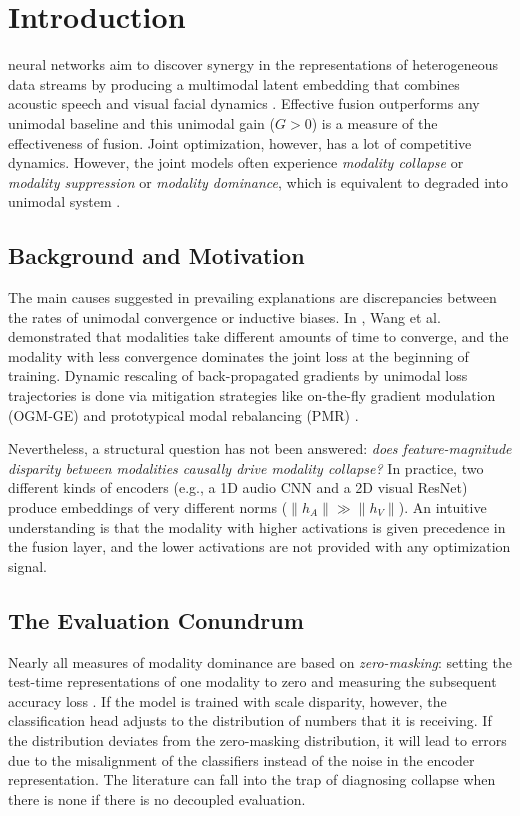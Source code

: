 \documentclass[conference]{IEEEtran}
\begin{document}
\section{Introduction}
  neural networks aim to discover synergy in the representations of heterogeneous data streams by producing a multimodal latent embedding that combines acoustic speech and visual facial dynamics \cite{baltrusaitis2019multimodal}.%
 Effective fusion outperforms any unimodal baseline and this unimodal gain ($G > 0$) is a measure of the effectiveness of fusion. Joint optimization, however, has a lot of competitive dynamics. However, the joint models often experience \textit{modality collapse} or \textit{modality suppression} or \textit{modality dominance}, which is equivalent to degraded into unimodal system \cite{wang2020makes, peng2022balanced, wu2022characterizing}.

\subsection{Background and Motivation}
The main causes suggested in prevailing explanations are discrepancies between the rates of unimodal convergence or inductive biases. In \cite{wang2020makes}, Wang et al. demonstrated that modalities take different amounts of time to converge, and the modality with less convergence dominates the joint loss at the beginning of training. Dynamic rescaling of back-propagated gradients by unimodal loss trajectories is done via mitigation strategies like on-the-fly gradient modulation (OGM-GE) \cite{peng2022balanced} and prototypical modal rebalancing (PMR) \cite{fan2023pmr}.

Nevertheless, a structural question has not been answered: \textit{does feature-magnitude disparity between modalities causally drive modality collapse?} In practice, two different kinds of encoders (e.g., a 1D audio CNN and a 2D visual ResNet) produce embeddings of very different norms ($\|h_A\| \gg \|h_V\|$). An intuitive understanding is that the modality with higher activations is given precedence in the fusion layer, and the lower activations are not provided with any optimization signal.

\subsection{The Evaluation Conundrum}
Nearly all measures of modality dominance are based on \textit{zero-masking}: setting the test-time representations of one modality to zero and measuring the subsequent accuracy loss \cite{wang2020makes, fan2023pmr}. If the model is trained with scale disparity, however, the classification head adjusts to the distribution of numbers that it is receiving. If the distribution deviates from the zero-masking distribution, it will lead to errors due to the misalignment of the classifiers instead of the noise in the encoder representation. The literature can fall into the trap of diagnosing collapse when there is none if there is no decoupled evaluation.
\end{document}
